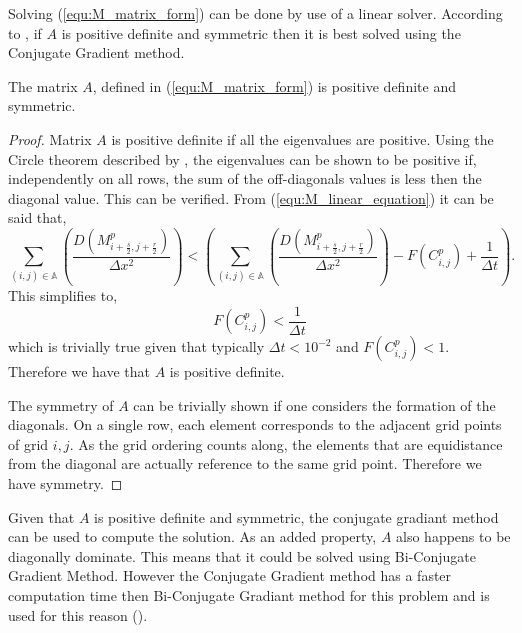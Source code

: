 Solving (\ref{equ:M_matrix_form}) can be done by use of a linear solver. 
According to \cite{barret1987templates}, if $A$ is positive definite and symmetric then it is best solved using the Conjugate Gradient method.

\begin{prop}
  The matrix $A$, defined in (\ref{equ:M_matrix_form}) is positive definite and symmetric.
\end{prop}
\begin{proof}
  Matrix $A$ is positive definite if all the eigenvalues are positive. 
  Using the Circle theorem described by \cite{gerschgorin1931uber_die_abgrenzung}, the eigenvalues can be shown to be positive if, independently on all rows, the sum of the off-diagonals values is less then the diagonal value.
  This can be verified. From (\ref{equ:M_linear_equation}) it can be said that,
  \begin{equation}
    \sum_{(i,j) \in \mathbb{A}} \left( \frac{D( M^{p}_{i+\frac{s}{2}, j+\frac{r}{2}} )}{\Delta x^2} \right)
     < \left( \sum_{(i,j) \in \mathbb{A}} \left( \frac{D( M^{p}_{i+\frac{s}{2}, j+\frac{r}{2}} )}{\Delta x^2} \right) 
    - F(C^{p}_{i,j}) + \frac{1}{\Delta t} \right). 
  \end{equation}
  This simplifies to,
  \begin{equation}
    F(C^{p}_{i,j}) < \frac{1}{\Delta t}
  \end{equation}
  which is trivially true given that typically $\Delta t < 10^{-2}$ and $F(C^{p}_{i,j}) < 1$. Therefore we have that $A$ is positive definite.

  The symmetry of $A$ can be trivially shown if one considers the formation of the diagonals.
  On a single row, each element corresponds to the adjacent grid points of grid $i,j$.
  As the grid ordering counts along, the elements that are equidistance from the diagonal are actually reference to the same grid point. 
  Therefore we have symmetry. 
\end{proof} 

Given that $A$ is positive definite and symmetric, the conjugate gradiant method can be used to compute the solution.
As an added property, $A$ also happens to be diagonally dominate.
This means that it could be solved using Bi-Conjugate Gradient Method.
However the Conjugate Gradient method has a faster computation time then Bi-Conjugate Gradiant method for this problem and is used for this reason (\cite{barret1987templates}).




